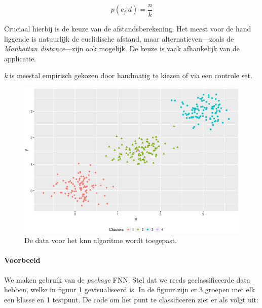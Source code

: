 \begin{equation}
p(c_j|d) = \frac{n}{k}
\end{equation}

Cruciaal hierbij is de keuze van de afstandsberekening. Het meest voor de hand liggende is natuurlijk de euclidische afstand, maar alternatieven---zoals de \emph{Manhattan distance}---zijn ook mogelijk. De keuze is vaak afhankelijk van de applicatie.

\emph{k} is meestal empirisch gekozen door handmatig te kiezen of via een controle set.

\begin{figure}[h]
\includegraphics[width=\textwidth]{res/knn_before.eps}
\caption{De data voor het knn algoritme wordt toegepast.}
\label{figure:data-knn}
\end{figure}

\newpage
\paragraph{Voorbeeld} We maken gebruik van de \emph{package} FNN. Stel dat we reeds geclassificeerde data hebben, welke in figuur \ref{figure:data-knn} gevisualiseerd is. In de figuur zijn er 3 groepen met elk een klasse en 1 testpunt. De code om het punt te classificeren ziet er als volgt uit:

\inputminted{R}{code/knn.R}

